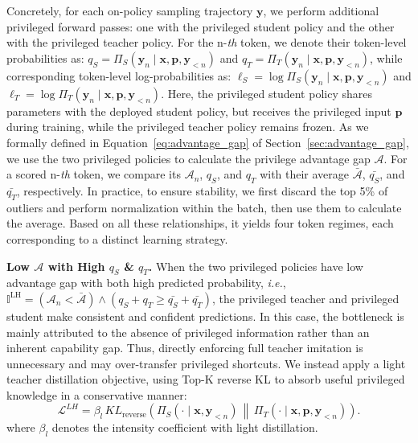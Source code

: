 \documentclass[]{jingdong}
\theoremstyle{plain}
\theoremstyle{definition}
\theoremstyle{remark}
\begin{document}
Concretely, for each on-policy sampling trajectory $\mathbf{y}$, we perform additional privileged forward passes: one with the privileged student policy and the other with the privileged teacher policy. For the n-\textit{th} token, we denote their token-level probabilities as: $q_{S}= \Pi_{S} \left( \mathbf{y}_{n} \mid \mathbf{x} , \mathbf{p}, \mathbf{y}_{<n} \right)$ and $ q_{T}= \Pi_{T} \left( \mathbf{y}_{n} \mid \mathbf{x} , \mathbf{p}, \mathbf{y}_{<n} \right)$, while corresponding token-level log-probabilities as:  $\ell_{S}= \log \Pi_{S} \left( \mathbf{y}_{n} \mid \mathbf{x} , \mathbf{p}, \mathbf{y}_{<n} \right)$ and $ \ell_{T}= \log \Pi_{T} \left( \mathbf{y}_{n} \mid \mathbf{x} , \mathbf{p}, \mathbf{y}_{<n} \right)$. 
Here, the privileged student policy shares parameters with the deployed student policy, but receives the privileged input $\mathbf{p}$ during training, while the privileged teacher policy remains frozen. As we formally defined in Equation~\ref{eq:advantage_gap} of Section~\ref{sec:advantage_gap}, we use the two privileged policies to calculate the privilege advantage gap $\mathcal{A}$. For a scored n-\textit{th} token, we compare its $\mathcal{A}_{n}$, $q_{S}$, and $q_{T}$  with their average $\bar{\mathcal{A}}$, $\bar{q_{S}}$, and $\bar{q_{T}}$, respectively. In practice, to ensure stability, we first discard the top 5\% of outliers and perform normalization within the batch, then use them to calculate the average. 
Based on all these relationships, it yields four token regimes, each corresponding to a distinct learning strategy.



\noindent\textbf{Low $\mathcal{A}$ with High $q_{S}$ \& $q_{T}$.}
When the two privileged policies have low advantage gap with both high predicted probability, \textit{i.e.}, $\mathbb{I}^{\mathrm{LH}}=\left(\mathcal{A}_{n}< \bar{\mathcal{A}}\right) \wedge \left(q_{S} + q_{T} \geq \bar{q_{S}} + \bar{q_{T}}\right)$, the privileged teacher and privileged student make consistent and confident predictions. 
In this case, the bottleneck is mainly attributed to the absence of privileged information rather than an inherent capability gap. 
Thus, directly enforcing full teacher imitation is unnecessary and may over-transfer privileged shortcuts. 
We instead apply a light teacher distillation objective, using Top-K reverse KL to absorb useful privileged knowledge in a conservative manner:
\begin{equation}
    \mathcal{L}^{LH}
    =
    \beta_{l}\,
    KL_{\mathrm{reverse}}
    \left(
        \Pi_{S}\left(\cdot\mid \mathbf{x},\mathbf{y}_{<n}\right)
        \,\middle\|\,
        \Pi_{T}\left(\cdot\mid \mathbf{x},\mathbf{p},\mathbf{y}_{<n}\right)
    \right).
\end{equation}
where $\beta_{l}$ denotes the intensity coefficient with light distillation.
\end{document}
